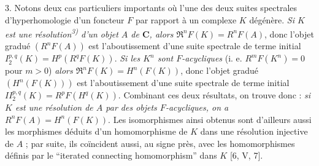 3. Notons deux cas particuliers importants où l'une des deux suites
spectrales d'hyperhomologie d'un foncteur $F$ par rapport à un complexe $K$
dégénère. \textit{Si $K$ est une résolution\textsuperscript{\textup{3)}} d'un objet
$A$ de $\mathbf{C}$, alors $\mathfrak R^nF(K)=R^nF(A)$}, donc l'objet gradué
$(R^nF(A))$ est l'aboutissement d'une suite spectrale de terme initial
$I_2^{p,q}(K)=H^p(R^qF(K))$. \textit{Si les $K^n$ sont
$F$-acycliques} (i. e. $R^mF(K^n)=0$ pour $m>0$) \textit{alors
$\mathfrak R^nF(K)=H^n(F(K))$}, donc l'objet gradué $(H^n(F(K)))$ est
l'aboutissement d'une suite spectrale de terme initial
$II_2^{p,q}(K)=R^pF(H^q(K))$. Combinant ces deux résultats, on
trouve donc : \textit{si $K$ est une résolution de $A$ par des objets
$F$-acycliques, on a $R^nF(A)=H^n(F(K))$}. Les isomorphismes ainsi obtenus sont
d'ailleurs aussi les morphismes déduits d'un homomorphisme de $K$ dans une
résolution injective de $A$ ; par suite, ils coïncident aussi, au signe près,
avec les homomorphismes définis par le ``iterated connecting homomorphism''
dans $K$ [6, V, 7].

